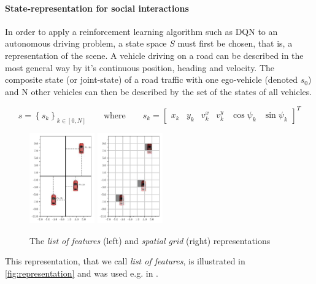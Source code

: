 \documentclass{article}
\begin{document}
\paragraph{State-representation for social interactions}{

In order to apply a reinforcement learning algorithm such as DQN to an autonomous driving problem, a state space $S$ must first be chosen, that is, a representation of the scene. A vehicle driving on a road can be described in the most general way by it's continuous position, heading and velocity. The composite state (or joint-state) of a road traffic with one ego-vehicle (denoted $s_0$) and N other vehicles can then be described by the set of the states of all vehicles.

\begin{equation*}
s = \left\lbrace s_k \right\rbrace_{k \in [0, N]}\qquad
\text{where}\qquad
s_k = \begin{bmatrix}
x_k & y_k & v^x_k & v^y_k & \cos\psi_k & \sin \psi_k
\end{bmatrix}^T
\end{equation*}


\begin{figure}[tp]
	\centering
	\includegraphics[width=0.25\textwidth]{img/coordinates}
	\includegraphics[width=0.25\textwidth]{img/map}
	\caption{The \emph{list of features} (left) and \emph{spatial grid} (right) representations}
	\label{fig:representation}
\end{figure}

This representation, that we call \emph{list of features}, is illustrated in \autoref{fig:representation} and was used e.g. in \citep{Bai2015, Gindele2015, Song2016, Sunberg2017, Paxton2017, Galceran2017, Chen2017}.


}
\end{document}
